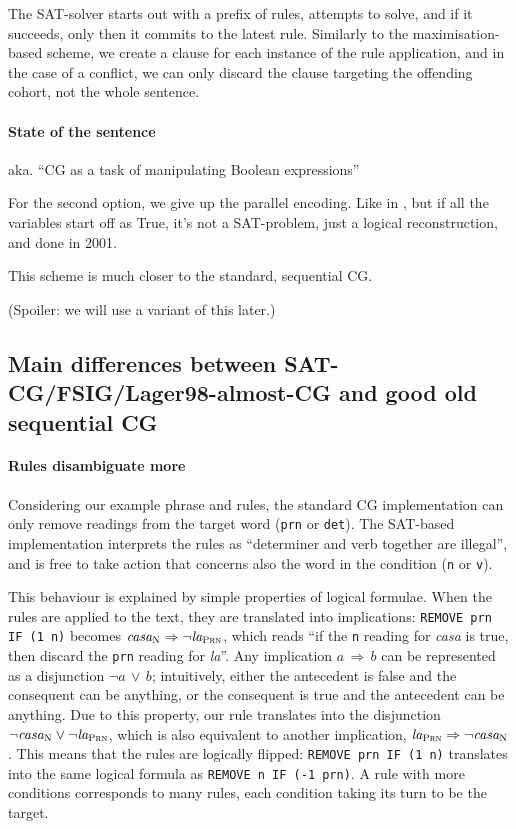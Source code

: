 The SAT-solver starts out with a prefix of rules, attempts to solve, and if it succeeds, only then it commits to the latest rule.
Similarly to the maximisation-based scheme, we create a clause for each instance of the rule application, and in the case of a conflict, we can only discard the clause targeting the offending cohort, not the whole sentence.



\paragraph{State of the sentence} aka. ``CG as a task of manipulating Boolean expressions''

For the second option, we give up the parallel encoding. Like in \cite{lager_nivre01}, but if all the variables start off as True, it's not a SAT-problem, just a logical reconstruction, and done in 2001.

This scheme is much closer to the standard, sequential CG.


(Spoiler: we will use a variant of this later.)



\subsection{Main differences between SAT-CG/FSIG/Lager98-almost-CG and good old sequential CG}

\paragraph{Rules disambiguate more}
Considering our example phrase and rules, the standard CG implementation
can only remove readings from the target word (\texttt{prn} or
\texttt{det}). The SAT-based implementation interprets the rules as
``determiner and verb together are illegal'', and is free to take action that concerns also the word in the condition (\texttt{n} or \texttt{v}).

This behaviour is explained by simple properties of logical formulae.
When the rules are applied to the text, they are translated into
implications: \texttt{REMOVE prn IF (1 n)} becomes $\text{\em casa}_{\text{\sc N}} \Rightarrow \neg \text{\em la}_{\text{\sc Prn}}$,
 which reads ``if the \texttt{n} reading for \emph{casa} is true, then
 discard the \texttt{prn} reading for \emph{la}''.
Any implication $a\,\Rightarrow\,b$ can be represented as a disjunction
$\neg a\,\vee\,b$; intuitively, either the antecedent is false
and the consequent can be anything, or the consequent is true and the
antecedent can be anything.
Due to this property, our rule translates into the disjunction 
$\neg\text{\em casa}_{\text{\sc N}}  \vee  \neg \text{\em la}_{\text{\sc Prn}}$,
which is also equivalent to another implication, 
$\text{\em la}_{\text{\sc Prn}} \Rightarrow \neg \text{\em casa}_{\text{\sc N}}$.
This means that the rules are logically flipped: \texttt{REMOVE prn IF
  (1 n)} translates into the same logical formula as  \texttt{REMOVE n
  IF (-1 prn)}. 
A rule with more conditions corresponds to many rules, each condition
taking its turn to be the target. %

